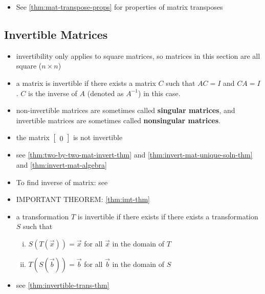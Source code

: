 \documentclass[a4paper,12pt]{article}
\theoremstyle{definition}
\theoremstyle{definition}
\newtheorem{example}{Example}[subsection]
\begin{document}
\begin{itemize}
\begin{itemize}
			\begin{example}
				$\begin{bmatrix}
					1 & 7 & 9\\
					6 & 4 & 2\\
					3 & 4 & 3
				\end{bmatrix}^T
				=
				\begin{bmatrix}
					1 & 6 & 3\\
					7 & 4 & 4\\
					9 & 2 & 3
				\end{bmatrix}$
			\end{example}
			
			\item See \autoref{thm:mat-transpose-props} for properties of matrix transposes
		\end{itemize} 
	\end{itemize}
	
	\subsection{Invertible Matrices}
	\begin{itemize}
		\item invertibility only applies to square matrices, so matrices in this section are all square ($n \times n$)
		
		\item a matrix is invertible if there exists a matrix $C$ such that $AC = I$ and $CA = I$. $C$ is the inverse of $A$ (denoted as $A^{-1}$) in this case.
		
		\item non-invertible matrices are sometimes called \textbf{singular matrices}, and invertible matrices are sometimes called \textbf{nonsingular matrices}.
		
		\item the matrix 
		$\begin{bmatrix}
			0
		\end{bmatrix}$
		is not invertible
		
		\item see \autoref{thm:two-by-two-mat-invert-thm} and \autoref{thm:invert-mat-unique-soln-thm} and \autoref{thm:invert-mat-algebra}
		
		\item To find inverse of matrix: see 
		
		\item IMPORTANT THEOREM: \autoref{thm:imt-thm}
		
		\item a transformation $T$ is invertible if there exists if there exists a transformation $S$ such that
		\begin{enumerate}[i.]
			\item $S(T(\vec{x})) = \vec{x}$ for all $\vec{x}$ in the domain of $T$
			\item $T(S(\vec{b})) = \vec{b}$ for all $\vec{b}$ in the domain of $S$
		\end{enumerate}
		
		\item see \autoref{thm:invertible-trans-thm}
	\end{itemize}
	
\end{document}
